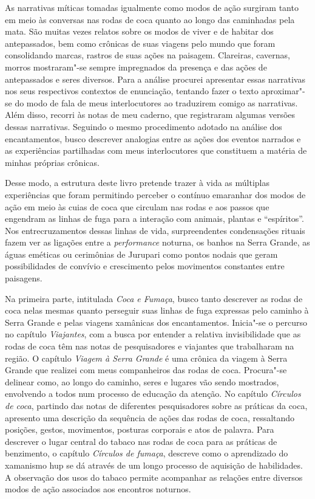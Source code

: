 As narrativas míticas tomadas igualmente como modos de ação surgiram
tanto em meio às conversas nas rodas de coca quanto ao longo das
caminhadas pela mata. São muitas vezes relatos sobre os modos de viver e
de habitar dos antepassados, bem como crônicas de suas viagens pelo
mundo que foram consolidando marcas, rastros de suas ações na paisagem.
Clareiras, cavernas, morros mostraram"-se sempre impregnados da presença
e das ações de antepassados e seres diversos. Para a análise procurei
apresentar essas narrativas nos seus respectivos contextos de
enunciação, tentando fazer o texto aproximar"-se do modo de fala de meus
interlocutores ao traduzirem comigo as narrativas. Além disso, recorri
às notas de meu caderno, que registraram algumas versões dessas
narrativas. Seguindo o mesmo procedimento adotado na análise dos
encantamentos, busco descrever analogias entre as ações dos eventos
narrados e as experiências partilhadas com meus interlocutores que
constituem a matéria de minhas próprias crônicas.

Desse modo, a estrutura deste livro pretende trazer à vida as múltiplas
experiências que foram permitindo perceber o contínuo emaranhar dos
modos de ação em meio às cuias de coca que circulam nas rodas e aos
passos que engendram as linhas de fuga para a interação com animais,
plantas e ``espíritos''. Nos entrecruzamentos dessas linhas de vida,
surpreendentes condensações rituais fazem ver as ligações entre a
\emph{performance} noturna, os banhos na Serra Grande, as águas eméticas
ou cerimônias de Jurupari como pontos nodais que geram possibilidades de
convívio e crescimento pelos movimentos constantes entre paisagens.

Na primeira parte, intitulada \emph{Coca e Fumaça}, busco tanto
descrever as rodas de coca nelas mesmas quanto perseguir suas linhas de
fuga expressas pelo caminho à Serra Grande e pelas viagens xamânicas dos
encantamentos. Inicia"-se o percurso no capítulo \emph{Viajantes}, com
a busca por entender a relativa invisibilidade que as rodas de coca têm
nas notas de pesquisadores e viajantes que trabalharam na região. O
capítulo \emph{Viagem à Serra Grande} é uma crônica da viagem à
Serra Grande que realizei com meus companheiros das rodas de coca.
Procura"-se delinear como, ao longo do caminho, seres e lugares vão sendo
mostrados, envolvendo a todos num processo de educação da atenção. No
capítulo \emph{Círculos de coca}, partindo das notas de diferentes
pesquisadores sobre as práticas da coca, apresento uma descrição da
sequência de ações das rodas de coca, ressaltando posições, gestos,
movimentos, posturas corporais e atos de palavra. Para descrever o lugar
central do tabaco nas rodas de coca para as práticas de benzimento, o
capítulo \emph{Círculos de fumaça}, descreve como o aprendizado do
xamanismo hup se dá através de um longo processo de aquisição de
habilidades. A observação dos usos do tabaco permite acompanhar as
relações entre diversos modos de ação associados aos encontros noturnos.

